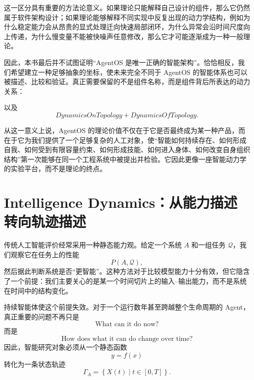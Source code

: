 这一区分具有重要的方法论意义。如果理论只能解释自己设计的组件，那么它仍然属于软件架构设计；如果理论能够解释不同实现中反复出现的动力学结构，例如为什么稳定能力会从昂贵的显式处理迁向快速局部闭环，为什么异常会沿时间尺度向上传递，为什么慢变量不能被快噪声任意修改，那么它才可能逐渐成为一种一般理论。

因此，本书最后并不试图证明“AgentOS 是唯一正确的智能架构”。恰恰相反，我们希望建立一种足够抽象的坐标，使未来完全不同于 AgentOS 的智能体系也可以被描述、比较和验证。真正需要保留的不是组件名称，而是组件背后所表达的动力关系：
\begin{statementbox}
\centering
{}
\end{statementbox}
\begin{statementbox}
\centering
{}
\end{statementbox}
\begin{statementbox}
\centering
{}
\end{statementbox}
以及
\begin{equation}
\boxed{
DynamicsOnTopology
+
DynamicsOfTopology.
}
\end{equation}

从这一意义上说，AgentOS 的理论价值不仅在于它是否最终成为某一种产品，而在于它为我们提供了一个足够复杂的人工对象，使“智能如何持续存在、如何形成自我、如何受到有限容量约束、如何形成技能、如何进入身体、如何改变自身组织结构”第一次能够在同一个工程系统中被提出并检验。它因此更像一座智能动力学的实验平台，而不是理论的终点。

\section{Intelligence Dynamics：从能力描述转向轨迹描述}

传统人工智能评价经常采用一种静态能力观。给定一个系统 $A$ 和一组任务 $\mathcal{Q}$，我们观察它在任务上的性能
\begin{equation}
P(A,\mathcal{Q}),
\end{equation}
然后据此判断系统是否“更智能”。这种方法对于比较模型能力十分有效，但它隐含了一个前提：我们主要关心的是某一个时间切片上的输入--输出能力，而不是系统在时间中的结构变化。

持续智能体使这个前提失效。对于一个运行数年甚至跨越整个生命周期的 Agent，真正重要的问题不再只是
\begin{equation}
\text{What can it do now?}
\end{equation}
而是
\begin{equation}
\text{How does what it can do change over time?}
\end{equation}
因此，智能研究对象必须从一个静态函数
\begin{equation}
y=f(x)
\end{equation}
转化为一条状态轨迹
\begin{equation}
\Gamma_{A}
=
\left\{
X(t)
\mid
t\in[0,T]
\right\}.
\end{equation}

